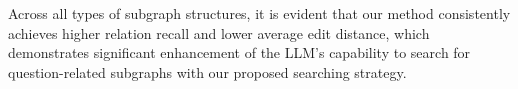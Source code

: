 \documentclass[11pt]{article}
\begin{document}
Across all types of subgraph structures, it is evident that our method consistently achieves higher relation recall and lower average edit distance, which demonstrates significant enhancement of the LLM's capability to search for question-related subgraphs with our proposed searching strategy.




\end{document}
